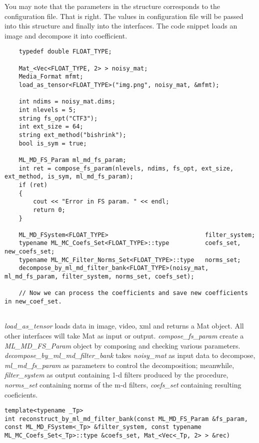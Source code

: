 \documentclass[a4paper,5pt]{article}
\begin{document}
You may note that the parameters in the structure corresponds to the configuration file. That is right. The values in configuration file will be passed into this structure and finally into the interfaces. The code snippet loads an image and decompose it into coefficient.

\begin{lstlisting}
	typedef double FLOAT_TYPE;

	Mat_<Vec<FLOAT_TYPE, 2> > noisy_mat;
	Media_Format mfmt;
	load_as_tensor<FLOAT_TYPE>("img.png", noisy_mat, &mfmt);
	
	int ndims = noisy_mat.dims;
	int nlevels = 5;
	string fs_opt("CTF3");
	int ext_size = 64;
	string ext_method("bishrink");
	bool is_sym = true;

	ML_MD_FS_Param ml_md_fs_param;
	int ret = compose_fs_param(nlevels, ndims, fs_opt, ext_size, ext_method, is_sym, ml_md_fs_param);
	if (ret)
	{
		cout << "Error in FS param. " << endl;
		return 0;
	}
	
	ML_MD_FSystem<FLOAT_TYPE> 					        filter_system;
	typename ML_MC_Coefs_Set<FLOAT_TYPE>::type 		    coefs_set, new_coefs_set;
	typename ML_MC_Filter_Norms_Set<FLOAT_TYPE>::type 	norms_set;
	decompose_by_ml_md_filter_bank<FLOAT_TYPE>(noisy_mat, ml_md_fs_param, filter_system, norms_set, coefs_set);
	
	// Now we can process the coefficients and save new coefficients in new_coef_set.
	
\end{lstlisting}
  \textit{load\_as\_tensor} loads data in image, video, xml and returns a Mat object. All other interfaces will take Mat as input or output.
  \textit{compose\_fs\_param} create a \textit{ML\_MD\_FS\_Param} object by composing and checking various parameters.
  \textit{decompose\_by\_ml\_md\_filter\_bank} takes \textit{noisy\_mat} as input data to decompose, \textit{ml\_md\_fs\_param} as parameters to control the decomposition; meanwhile, \textit{ filter\_system} as output containing 1-d filters produced by the procedure, \textit{norms\_set} containing norms of the m-d filters, \textit{coefs\_set} containing resulting coeficients. 


\begin{lstlisting}
template<typename _Tp>
int reconstruct_by_ml_md_filter_bank(const ML_MD_FS_Param &fs_param, const ML_MD_FSystem<_Tp> &filter_system, const typename ML_MC_Coefs_Set<_Tp>::type &coefs_set, Mat_<Vec<_Tp, 2> > &rec)
\end{lstlisting}
\end{document}
